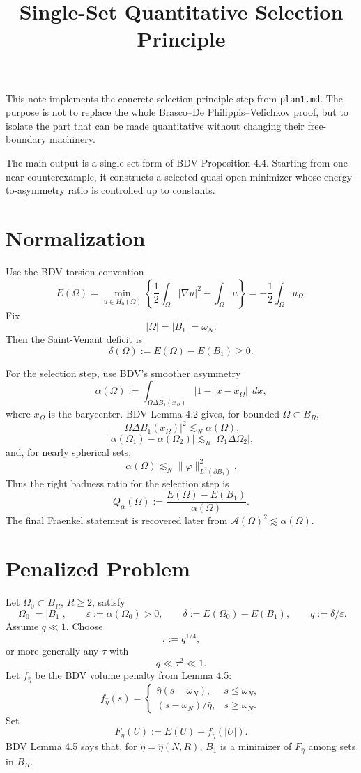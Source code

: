 \documentclass[11pt]{article}
\title{Single-Set Quantitative Selection Principle}
\author{}
\date{}
\begin{document}
\maketitle

This note implements the concrete selection-principle step from
\texttt{plan1.md}. The purpose is not to replace the whole
Brasco--De Philippis--Velichkov proof, but to isolate the part that can be
made quantitative without changing their free-boundary machinery.

The main output is a single-set form of BDV Proposition 4.4. Starting from one
near-counterexample, it constructs a selected quasi-open minimizer whose
energy-to-asymmetry ratio is controlled up to constants.

\section{Normalization}

Use the BDV torsion convention
\[
E(\Omega)
=
\min_{u\in H^1_0(\Omega)}
\left\{
\frac12\int_\Omega |\nabla u|^2-\int_\Omega u
\right\}
=
-\frac12\int_\Omega u_\Omega.
\]
Fix
\[
|\Omega|=|B_1|=\omega_N.
\]
Then the Saint-Venant deficit is
\[
\delta(\Omega):=E(\Omega)-E(B_1)\ge0.
\]

For the selection step, use BDV's smoother asymmetry
\[
\alpha(\Omega)
:=
\int_{\Omega\Delta B_1(x_\Omega)}
\bigl|1-|x-x_\Omega|\bigr|\,dx,
\]
where \(x_\Omega\) is the barycenter. BDV Lemma 4.2 gives, for bounded
\(\Omega\subset B_R\),
\[
|\Omega\Delta B_1(x_\Omega)|^2\lesssim_N \alpha(\Omega),
\]
\[
|\alpha(\Omega_1)-\alpha(\Omega_2)|
\lesssim_R
|\Omega_1\Delta\Omega_2|,
\]
and, for nearly spherical sets,
\[
\alpha(\Omega)\lesssim_N
\|\varphi\|_{L^2(\partial B_1)}^2.
\]
Thus the right badness ratio for the selection step is
\[
Q_\alpha(\Omega)
:=
\frac{E(\Omega)-E(B_1)}{\alpha(\Omega)}.
\]
The final Fraenkel statement is recovered later from
\(\mathcal A(\Omega)^2\lesssim \alpha(\Omega)\).

\section{Penalized Problem}

Let \(\Omega_0\subset B_R\), \(R\ge2\), satisfy
\[
|\Omega_0|=|B_1|,
\qquad
\varepsilon:=\alpha(\Omega_0)>0,
\qquad
\delta:=E(\Omega_0)-E(B_1),
\qquad
q:=\delta/\varepsilon.
\]
Assume \(q\ll1\). Choose
\[
\tau:=q^{1/4},
\]
or more generally any \(\tau\) with
\[
q\ll \tau^2\ll1.
\]
Let \(f_{\hat\eta}\) be the BDV volume penalty from Lemma 4.5:
\[
f_{\hat\eta}(s)=
\begin{cases}
\hat\eta(s-\omega_N),&s\le\omega_N,\\
(s-\omega_N)/\hat\eta,&s\ge\omega_N.
\end{cases}
\]
Set
\[
F_{\hat\eta}(U):=E(U)+f_{\hat\eta}(|U|).
\]
BDV Lemma 4.5 says that, for \(\hat\eta=\hat\eta(N,R)\), \(B_1\) is a
minimizer of \(F_{\hat\eta}\) among sets in \(B_R\).
\end{document}
